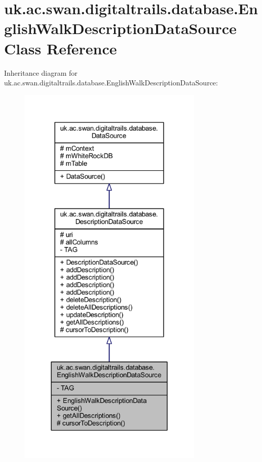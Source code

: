 \hypertarget{classuk_1_1ac_1_1swan_1_1digitaltrails_1_1database_1_1_english_walk_description_data_source}{\section{uk.\+ac.\+swan.\+digitaltrails.\+database.\+English\+Walk\+Description\+Data\+Source Class Reference}
\label{classuk_1_1ac_1_1swan_1_1digitaltrails_1_1database_1_1_english_walk_description_data_source}
}


Inheritance diagram for uk.\+ac.\+swan.\+digitaltrails.\+database.\+English\+Walk\+Description\+Data\+Source\+:
\nopagebreak
\begin{figure}[H]
\begin{center}
\leavevmode
\includegraphics[width=251pt]{classuk_1_1ac_1_1swan_1_1digitaltrails_1_1database_1_1_english_walk_description_data_source__inherit__graph}
\end{center}
\end{figure}


